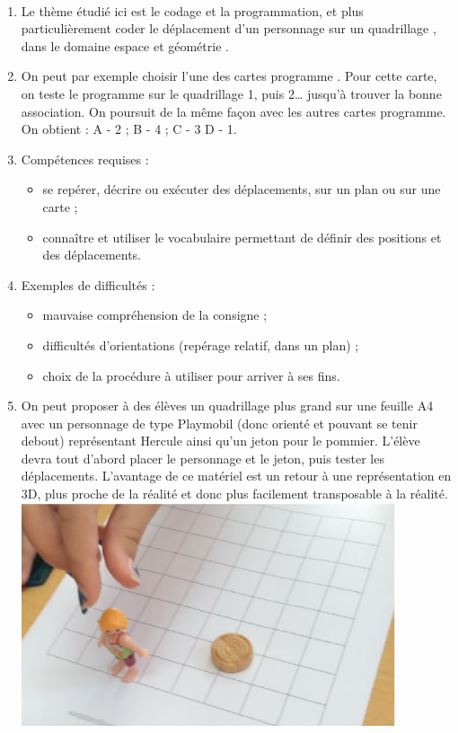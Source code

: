 \ \\ [-5mm]
\begin{enumerate}
   \item Le thème étudié ici est le codage et la programmation, et plus particulièrement \og coder le déplacement d'un personnage sur un quadrillage \fg{}, dans le domaine \og espace et géométrie \fg.
   \item On peut par exemple choisir l'une des cartes \og programme \fg{}. Pour cette carte, on teste le programme sur le quadrillage 1, puis 2\dots {} jusqu'à trouver la bonne association. On poursuit de la même façon avec les autres cartes programme. On obtient : A - 2 \quad ; \quad B - 4 \quad ; \quad C - 3 \quad D - 1.
   \item Compétences requises :
   \begin{itemize}
      \item se repérer, décrire ou exécuter des déplacements, sur un
plan ou sur une carte ;
      \item connaître et utiliser le vocabulaire permettant de définir des
positions et des déplacements.
   \end{itemize}
   \item Exemples de difficultés :
   \begin{itemize}
      \item mauvaise compréhension de la consigne ;
      \item difficultés d'orientations (repérage relatif, dans un plan) ;
      \item choix de la procédure à utiliser pour arriver à ses fins.
   \end{itemize}
   \item On peut proposer à des élèves un quadrillage plus grand sur une feuille A4 avec un personnage de type Playmobil (donc orienté et pouvant se tenir debout) représentant Hercule ainsi qu'un jeton pour le pommier. L'élève devra tout d'abord placer le personnage et le jeton, puis tester les déplacements. L'avantage de ce matériel est un retour à une représentation en 3D, plus proche de la réalité et donc plus facilement transposable à la réalité. \\
   \hspace*{3cm} \includegraphics[width=11cm]{Geometrie_did/Images/Geo6_analyse_Playmobil} \\

\end{enumerate}
